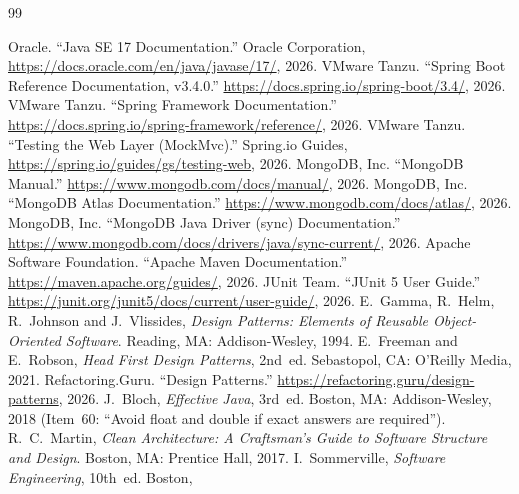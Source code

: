 \documentclass[12pt,a4paper]{report}
\begin{document}
\begin{thebibliography}{99}

     Oracle. ``Java SE 17 Documentation.'' Oracle Corporation,
                     \url{https://docs.oracle.com/en/java/javase/17/}, 2026.
 VMware Tanzu. ``Spring Boot Reference Documentation, v3.4.0.''
                     \url{https://docs.spring.io/spring-boot/3.4/}, 2026.
    VMware Tanzu. ``Spring Framework Documentation.''
                     \url{https://docs.spring.io/spring-framework/reference/}, 2026.
 VMware Tanzu. ``Testing the Web Layer (MockMvc).'' Spring.io
                     Guides, \url{https://spring.io/guides/gs/testing-web}, 2026.
   MongoDB, Inc. ``MongoDB Manual.''
                     \url{https://www.mongodb.com/docs/manual/}, 2026.
     MongoDB, Inc. ``MongoDB Atlas Documentation.''
                     \url{https://www.mongodb.com/docs/atlas/}, 2026.
 MongoDB, Inc. ``MongoDB Java Driver (sync) Documentation.''
                     \url{https://www.mongodb.com/docs/drivers/java/sync-current/}, 2026.
     Apache Software Foundation. ``Apache Maven Documentation.''
                     \url{https://maven.apache.org/guides/}, 2026.
    JUnit Team. ``JUnit 5 User Guide.''
                     \url{https://junit.org/junit5/docs/current/user-guide/}, 2026.
       E.~Gamma, R.~Helm, R.~Johnson and J.~Vlissides, \emph{Design
                     Patterns: Elements of Reusable Object-Oriented Software}.
                     Reading, MA: Addison-Wesley, 1994.
 E.~Freeman and E.~Robson, \emph{Head First Design Patterns},
                     2nd~ed. Sebastopol, CA: O'Reilly Media, 2021.
 Refactoring.Guru. ``Design Patterns.''
                     \url{https://refactoring.guru/design-patterns}, 2026.
 J.~Bloch, \emph{Effective Java}, 3rd~ed. Boston, MA:
                     Addison-Wesley, 2018 (Item~60: ``Avoid float and double if exact
                     answers are required'').
 R.~C.~Martin, \emph{Clean Architecture: A Craftsman's Guide to
                     Software Structure and Design}. Boston, MA: Prentice Hall, 2017.
 I.~Sommerville, \emph{Software Engineering}, 10th~ed. Boston,

\end{thebibliography}
\end{document}
